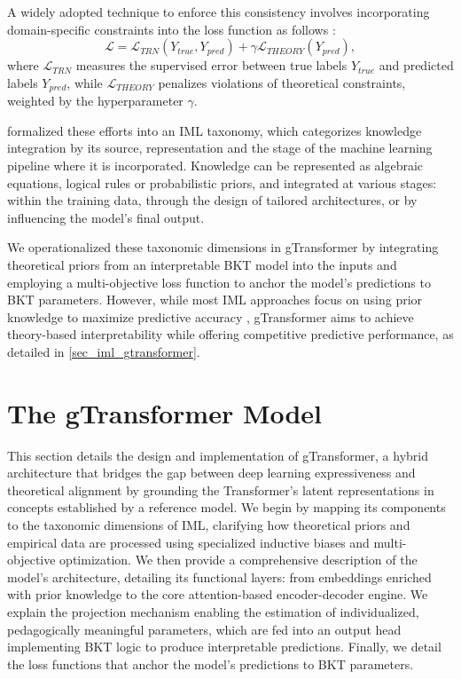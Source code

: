 \documentclass[applsci,article,submit,moreauthors,pdftex]{Definitions/mdpi}
\begin{document}
A widely adopted technique to enforce this consistency involves incorporating domain-specific constraints into the loss function as follows \citep{karpatne2017theory, willard2022integrating}: 
\begin{equation} \label{eq_theory_loss}
\mathcal{L} = \mathcal{L}_{TRN}(Y_{true}, Y_{pred}) + \gamma \mathcal{L}_{THEORY}(Y_{pred}),
\end{equation}
where $\mathcal{L}_{TRN}$ measures the supervised error between true labels $Y_{true}$ and predicted labels $Y_{pred}$, while $\mathcal{L}_{THEORY}$ penalizes violations of theoretical constraints, weighted by the hyperparameter $\gamma$. 

\citet{vonrueden2021informed} formalized these efforts into an IML taxonomy, which categorizes knowledge integration by its source, representation and the stage of the machine learning pipeline where it is incorporated. Knowledge can be represented as algebraic equations, logical rules or probabilistic priors, and integrated at various stages: within the training data, through the design of tailored architectures, or by influencing the model's final output. 

We operationalized these taxonomic dimensions in gTransformer by integrating theoretical priors from an interpretable BKT model into the inputs and employing a multi-objective loss function to anchor the model's predictions to BKT parameters. However, while most IML approaches focus on using prior knowledge to maximize predictive accuracy \citep{vonrueden2021informed}, gTransformer aims to achieve theory-based interpretability while offering competitive predictive performance, as detailed in \cref{sec_iml_gtransformer}. 


\section{The gTransformer Model} \label{sec_arch}

This section details the design and implementation of gTransformer, a hybrid architecture that bridges the gap between deep learning expressiveness and theoretical alignment by grounding the Transformer's latent representations in concepts established by a reference model. We begin by mapping its components to the taxonomic dimensions of IML, clarifying how theoretical priors and empirical data are processed using specialized inductive biases and multi-objective optimization. We then provide a comprehensive description of the model's architecture, detailing its functional layers: from embeddings enriched with prior knowledge to the core attention-based encoder-decoder engine. We explain the projection mechanism enabling the estimation of individualized, pedagogically meaningful parameters, which are fed into an output head implementing BKT logic to produce interpretable predictions. Finally, we detail the loss functions that anchor the model's predictions to BKT parameters.
\end{document}

